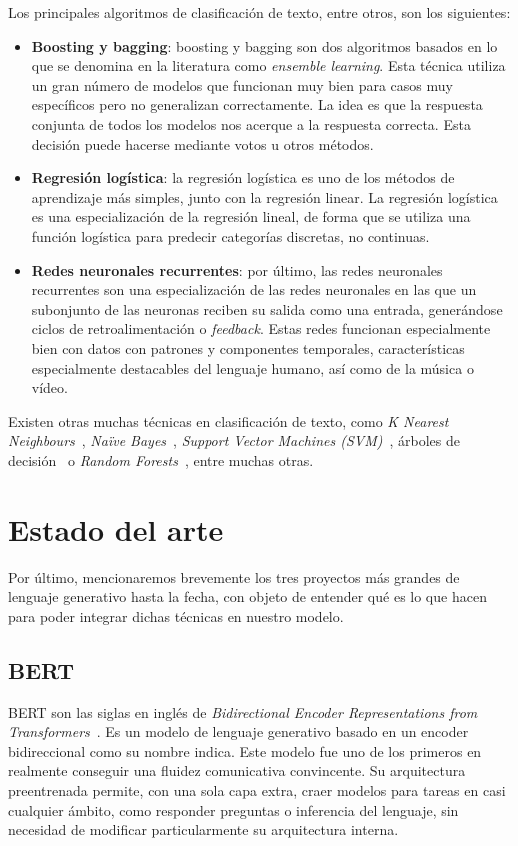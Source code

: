 Los principales algoritmos de clasificación de texto, entre otros, son los siguientes:

\begin{itemize}
    \item \textbf{Boosting y bagging}: boosting y bagging son dos algoritmos basados en lo que se denomina en la literatura como \textit{ensemble learning}. Esta técnica utiliza un gran número de modelos que funcionan muy bien para casos muy específicos pero no generalizan correctamente. La idea es que la respuesta conjunta de todos los modelos nos acerque a la respuesta correcta. Esta decisión puede hacerse mediante votos u otros métodos. \cite{Bauer2004AnEC}
    \item \textbf{Regresión logística}: la regresión logística es uno de los métodos de aprendizaje más simples, junto con la regresión linear. La regresión logística es una especialización de la regresión lineal, de forma que se utiliza una función logística para predecir categorías discretas, no continuas. \cite{CoxLogit1989}
    \item \textbf{Redes neuronales recurrentes}: por último, las redes neuronales recurrentes son una especialización de las redes neuronales en las que un subonjunto de las neuronas reciben su salida como una entrada, generándose ciclos de retroalimentación o \textit{feedback}. Estas redes funcionan especialmente bien con datos con patrones y componentes temporales, características especialmente destacables del lenguaje humano, así como de la música o vídeo. \cite{ZhouLSTM}
\end{itemize}


Existen otras muchas técnicas en clasificación de texto, como \textit{K Nearest Neighbours}~\cite{KNNXiao2007}, \textit{Naïve Bayes}~\cite{FrankNaive2006}, \textit{Support Vector Machines (SVM)}~\cite{SVMJoa1998}, árboles de decisión~\cite{DecisionTreeNoorman2018} o \textit{Random Forests}~\cite{breiman2001random}, entre muchas otras. 

\section{Estado del arte}

Por último, mencionaremos brevemente los tres proyectos más grandes de lenguaje generativo hasta la fecha, con objeto de entender qué es lo que hacen para poder integrar dichas técnicas en nuestro modelo.

\subsection{BERT}
BERT son las siglas en inglés de \textit{Bidirectional Encoder Representations from Transformers}~\cite{bertDevlin2019}. Es un modelo de lenguaje generativo basado en un encoder bidireccional como su nombre indica. Este modelo fue uno de los primeros en realmente conseguir una fluidez comunicativa convincente. Su arquitectura preentrenada permite, con una sola capa extra, craer modelos para tareas en casi cualquier ámbito, como responder preguntas o inferencia del lenguaje, sin necesidad de modificar particularmente su arquitectura interna.



